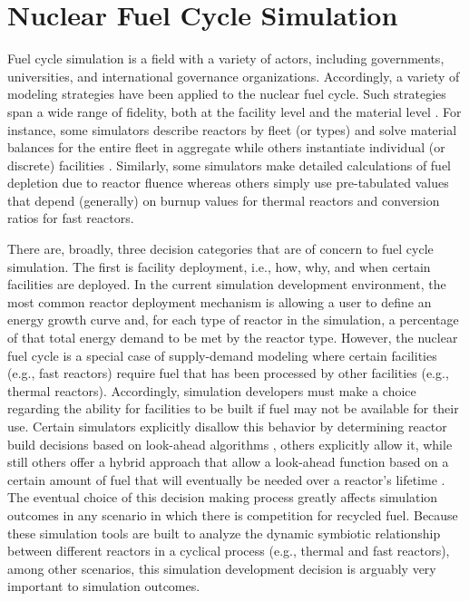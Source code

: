 
\section{Nuclear Fuel Cycle Simulation}\label{intro:fcs}
 
Fuel cycle simulation is a field with a variety of actors, including
governments, universities, and international governance
organizations. Accordingly, a variety of modeling strategies have been applied
to the nuclear fuel cycle. Such strategies span a wide range of fidelity, both
at the facility level and the material level
\cite{boucher_cosi:_2006,busquim_e_silva_system_2008,yacout_vision_2006}. For
instance, some simulators describe reactors by fleet (or types) and solve
material balances for the entire fleet in aggregate while others instantiate
individual (or discrete) facilities \cite{schneider_nfcsim:_2005}. Similarly,
some simulators make detailed calculations of fuel depletion due to reactor
fluence whereas others simply use pre-tabulated values
that depend (generally) on burnup values for thermal reactors and conversion
ratios for fast reactors. 

There are, broadly, three decision categories that are of concern to fuel cycle
simulation. The first is facility deployment, i.e., how, why, and when certain
facilities are deployed. In the current simulation development environment, the
most common reactor deployment mechanism is allowing a user to define an energy
growth curve and, for each type of reactor in the simulation, a percentage of
that total energy demand to be met by the reactor type. However, the nuclear
fuel cycle is a special case of supply-demand modeling where certain facilities
(e.g., fast reactors) require fuel that has been processed by other facilities
(e.g., thermal reactors). Accordingly, simulation developers must make a choice
regarding the ability for facilities to be built if fuel may not be available
for their use. Certain simulators explicitly disallow this behavior by
determining reactor build decisions based on look-ahead algorithms
\cite{schweitzer_improved_2008}, others explicitly allow it, while still others
offer a hybrid approach that allow a look-ahead function based on a certain
amount of fuel that will eventually be needed over a reactor's lifetime
\cite{van_den_durpel_daness_2009}. The eventual choice of this decision making
process greatly affects simulation outcomes in any scenario in which there is
competition for recycled fuel. Because these simulation tools are built to
analyze the dynamic symbiotic relationship between different reactors in a
cyclical process (e.g., thermal and fast reactors), among other scenarios, this
simulation development decision is arguably very important to simulation
outcomes.

